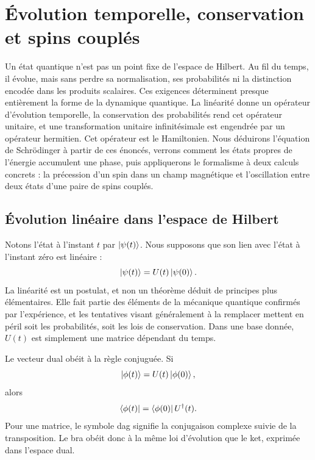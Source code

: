 \chapter{Évolution temporelle, conservation et spins couplés}

Un état quantique n’est pas un point fixe de l’espace de Hilbert. Au fil du temps, il évolue, mais sans perdre sa normalisation, ses probabilités ni la distinction encodée dans les produits scalaires. Ces exigences déterminent presque entièrement la forme de la dynamique quantique. La linéarité donne un opérateur d’évolution temporelle, la conservation des probabilités rend cet opérateur unitaire, et une transformation unitaire infinitésimale est engendrée par un opérateur hermitien. Cet opérateur est le Hamiltonien. Nous déduirons l’équation de Schr\"odinger à partir de ces énoncés, verrons comment les états propres de l’énergie accumulent une phase, puis appliquerons le formalisme à deux calculs concrets : la précession d’un spin dans un champ magnétique et l’oscillation entre deux états d’une paire de spins couplés.

\section{Évolution linéaire dans l’espace de Hilbert}

Notons l’état à l’instant \(t\) par \(\left\lvert\psi(t)\right\rangle\). Nous supposons que son lien avec l’état à l’instant zéro est linéaire :
\begin{equation}
\left\lvert\psi(t)\right\rangle=U(t)\left\lvert\psi(0)\right\rangle.
\end{equation}
La linéarité est un postulat, et non un théorème déduit de principes plus élémentaires. Elle fait partie des éléments de la mécanique quantique confirmés par l’expérience, et les tentatives visant généralement à la remplacer mettent en péril soit les probabilités, soit les lois de conservation. Dans une base donnée, \(U(t)\) est simplement une matrice dépendant du temps.

Le vecteur dual obéit à la règle conjuguée. Si
\begin{equation}
\left\lvert\phi(t)\right\rangle=U(t)\left\lvert\phi(0)\right\rangle,
\end{equation}
alors
\begin{equation}
\left\langle\phi(t)\right\rvert=\left\langle\phi(0)\right\rvert U^\dagger(t).
\end{equation}
Pour une matrice, le symbole dag signifie la conjugaison complexe suivie de la transposition. Le bra obéit donc à la même loi d’évolution que le ket, exprimée dans l’espace dual.

